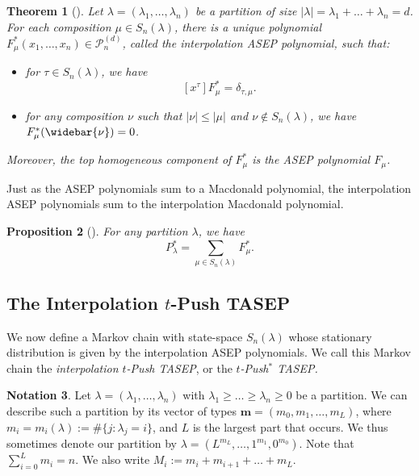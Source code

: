 \documentclass[12pt]{amsart}
\newtheorem{thm}{Theorem}[section]
\newtheorem{prop}[thm]{Proposition}
\theoremstyle{definition}
\newtheorem{notation}[thm]{Notation}
\newcommand{\mcP}{\mathcal P}
\begin{document}
\begin{thm}[{\cite[Theorem 2.17]{BenDaliWilliams2025}}]
    Let $\lambda=(\lambda_1,\dots,\lambda_n)$ be a partition of size
    $|\lambda|=\lambda_1+ \dots + \lambda_n=d$.  For each composition $\mu\in S_n(\lambda)$, there is a unique polynomial $F^*_\mu(x_1,\dots,x_n)\in \mcP_n^{(d)}$, called the \emph{interpolation ASEP polynomial}, such that:
    \begin{itemize}
     \item for $\tau \in S_n(\lambda)$, we have 
     \begin{equation}\label{eq:normalization_F}
         [x^\tau]F^*_\mu =\delta_{\tau,\mu}.
     \end{equation}
        \item for any composition $\nu$ such that $|\nu|\leq |\mu|$ and $\nu\notin S_n(\lambda)$, we have
        $F^*_\mu(\widebar{\nu})=0$.
    \end{itemize}
Moreover, the top homogeneous component of $F^*_\mu$ is the ASEP polynomial $F_\mu$. 
\end{thm}

Just as the ASEP polynomials sum to a Macdonald polynomial, the interpolation ASEP polynomials sum to the interpolation Macdonald polynomial.  

\begin{prop}[{\cite[Proposition 2.15]{BenDaliWilliams2025}}]
\label{prop:symmetrization}For any partition $\lambda$, we have $$P^*_\lambda=\sum_{\mu\in S_n(\lambda)}F^*_\mu.$$
\end{prop}




\subsection{The Interpolation \texorpdfstring{$t$}{t}-Push TASEP}
We now define a Markov chain with state-space $S_n(\lambda)$ 
whose stationary distribution is given by the interpolation ASEP polynomials.  We call this Markov chain  the \emph{interpolation $t$-Push TASEP}, or the \emph{$t$-Push$^*$ TASEP.}

\begin{notation}\label{not:type}
Let $\lambda=(\lambda_1,\dots, \lambda_n)$
with $\lambda_1\geq\dots\geq\lambda_n\geq 0$ be a partition. We can
describe such a partition by its vector of types
$\mathbf{m}=(m_0, m_1, \dots, m_L)$, where
$m_i=m_i(\lambda):=\#\{j:\lambda_j=i\}$,
and $L$ is the largest part that occurs.
We thus sometimes denote our partition by
$\lambda=(L^{m_L}, \dots, 1^{m_1}, 0^{m_0})$.
Note that $\sum_{i=0}^L m_i=n$.  We also write
$M_i:=m_i+ m_{i+1} + \dots + m_L$.
\end{notation}
\end{document}
